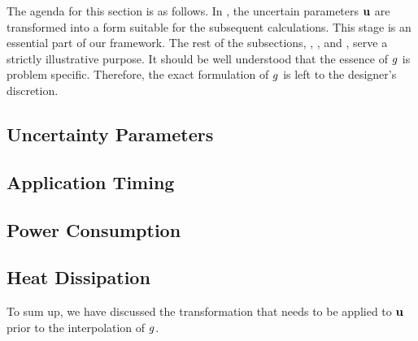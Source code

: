 The agenda for this section is as follows. In , the uncertain
parameters $\mathbf{u}$ are transformed into a form suitable for the subsequent
calculations. This stage is an essential part of our framework. The rest of the
subsections, , , and , serve a strictly
illustrative purpose.  It should
be well understood that the essence of $g$ is problem specific. Therefore, the
exact formulation of $g$ is left to the designer's discretion.

\subsection{Uncertainty Parameters} 


\subsection{Application Timing} 


\subsection{Power Consumption} 


\subsection{Heat Dissipation} 


To sum up, we have discussed the transformation that needs to be applied to
$\mathbf{u}$ prior to the interpolation of $g$. 
